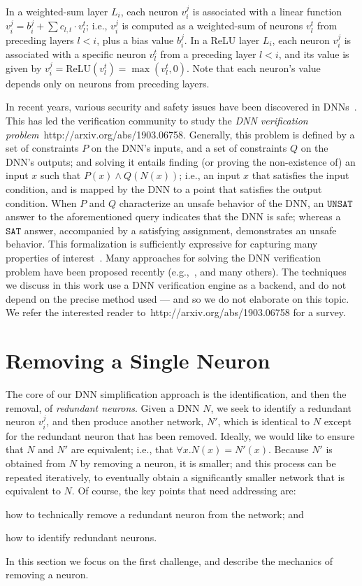 \documentclass[10pt, conference, twocolumn, compsocconf]{IEEEtran}
\theoremstyle{remark}
\newcommand{\relu}{\text{ReLU}\xspace}
\newcommand{\sat}{\texttt{SAT}}
\newcommand{\unsat}{\texttt{UNSAT}}
\begin{document}
In a weighted-sum layer $L_i$, each neuron $v_i^j$ is associated with
a linear function $v_i^j=b_i^j + \sum c_{l,t}\cdot v_l^t$; i.e.,
$v_i^j$ is computed as a weighted-sum of neurons $v_l^t$ from
preceding layers $l<i$, plus a bias value $b_i^j$. In a ReLU layer
$L_i$, each neuron $v_i^j$ is associated with a specific neuron
$v_l^t$ from a preceding layer $l<i$, and its value is given by
$v_i^j=\relu{}(v_l^t)=\max(v_l^t, 0)$. Note that each neuron's value
depends only on neurons from preceding layers.

In recent years, various security and safety issues have been
discovered in DNNs~\cite{SzZaSuBrErGoFe13,KaBaDiJuKo17}. This has led
the verification community to study the \emph{DNN verification
  problem}~http://arxiv.org/abs/1903.06758. Generally, this problem is defined by
a set of constraints $P$ on the DNN's inputs, and a set of constraints
$Q$ on the DNN's outputs; and solving it entails finding (or proving
the non-existence of) an input $x$ such that $P(x)\wedge Q(N(x))$;
i.e., an input $x$ that satisfies the input condition, and is mapped
by the DNN to a point that satisfies the output condition. When $P$
and $Q$ characterize an unsafe behavior of the DNN, an $\unsat{}$
answer to the aforementioned query indicates that the DNN is safe;
whereas a $\sat{}$ answer, accompanied by a satisfying assignment,
demonstrates an unsafe behavior. This formalization is sufficiently
expressive for capturing many properties of
interest~\cite{KaBaDiJuKo17}.  Many approaches for solving the DNN
verification problem have been proposed recently
(e.g.,~\cite{KaBaDiJuKo17,HuKwWaWu17,GeMiDrTsChVe18,WaPeWhYaJa18}, and
many others). The techniques we discuss in this work use a DNN
verification engine as a backend, and do not depend on the precise
method used --- and so we do not elaborate on this topic. We refer the
interested reader to~http://arxiv.org/abs/1903.06758 for a survey.

\section{Removing a Single Neuron}
\label{sec:formalization}

The core of our DNN simplification approach is the identification, and
then the removal, of \emph{redundant neurons}. Given a DNN $N$, we seek to
identify a redundant neuron $v_i^j$, and then produce another network,
$N'$, which is identical to $N$ except for the redundant neuron that
has been removed. Ideally, we would like to ensure that $N$ and $N'$ are
equivalent; i.e., that $\forall x. N(x)=N'(x)$. Because $N'$ is
obtained from $N$ by removing a neuron, it is smaller; and this
process can be repeated iteratively, to eventually obtain a
significantly smaller network that is equivalent to $N$.
Of course, the key points that need addressing are:
\begin{inparaenum}[(i)]
\item how to technically remove a redundant neuron from the network; and
\item how to identify redundant neurons.
\end{inparaenum}
In this section we focus on the first challenge, and describe the
mechanics of removing a neuron.
\end{document}
